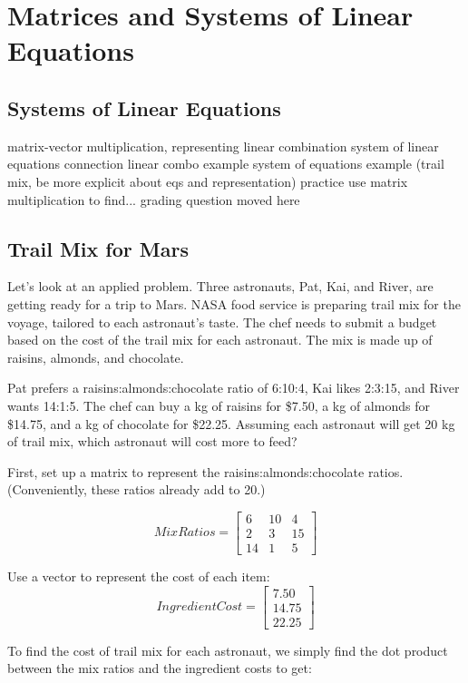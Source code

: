 \chapter{Matrices and Systems of Linear Equations}

\section{Systems of Linear Equations}
matrix-vector multiplication, representing linear combination
system of linear equations connection
linear combo example
system of equations example (trail mix, be more explicit about eqs and representation)
practice
	use matrix multiplication to find...
	grading question moved here

\section{Trail Mix for Mars}
Let's look at an applied problem. Three astronauts, Pat, Kai, and River, are getting ready for a trip to Mars. NASA food service is preparing trail mix for the voyage, tailored to each astronaut's taste. The chef needs to submit a budget based on the cost of the trail mix for each astronaut. The mix is made up of raisins, almonds, and chocolate.

Pat prefers a raisins:almonds:chocolate ratio of 6:10:4, Kai likes 2:3:15, and River wants 14:1:5. The chef can buy a kg of raisins for \$7.50, a kg of almonds for \$14.75, and a kg of chocolate for \$22.25. Assuming each astronaut will get 20 kg of trail mix, which astronaut will cost more to feed?

First, set up a matrix to represent the raisins:almonds:chocolate ratios. (Conveniently, these ratios already add to 20.)

$$MixRatios = \begin{bmatrix}
6 & 10 & 4  \\
2 & 3 & 15 \\
14 & 1 & 5
\end{bmatrix}$$

Use a vector to represent the cost of each item:
$$IngredientCost = 
\begin{bmatrix}
7.50 \\
14.75 \\
22.25
\end{bmatrix}$$

To find the cost of trail mix for each astronaut, we simply find the dot product between the mix ratios and the ingredient costs to get:


